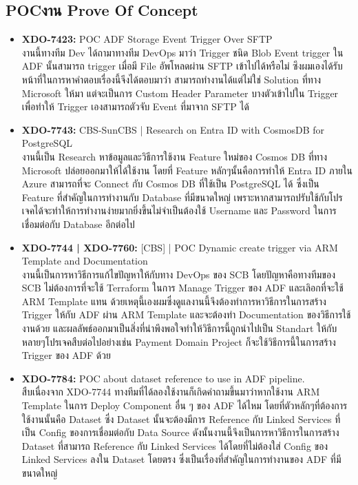\subsection{\ifenglish POC\else งาน Prove Of Concept\fi}
\begin{itemize}
      \item \textbf{XDO-7423:} POC ADF Storage Event Trigger Over SFTP\\
            งานนี้ทางทีม Dev ได้ถามาทางทีม DevOps มาว่า Trigger ชนิด Blob Event trigger ใน ADF นั้นสามารถ trigger เมื่อมี File อัพโหลดผ่าน SFTP เข้าไปได้หรือไม่ ซึงผมเองได้รับหน้าที่ในการหาคำตอบเรื่องนี้จีงได้ตอบมาว่า สามารถทำงานได้แต่ไม่ใช่ Solution ที่ทาง Microsoft ให้มา แต่จะเป็นการ Custom Header Parameter บางตัวเข้าไปใน Trigger เพื่อทำให้ Trigger เองสามารถตัวจับ Event ที่มาจาก SFTP ได้
      \item \textbf{XDO-7743:} CBS-SunCBS | Research on Entra ID with CosmosDB for PostgreSQL\\
            งานนี้เป็น Research หาข้อมูลและวิธีการใช้งาน Feature ใหม่ของ Cosmos DB ที่ทาง Microsoft ปล่อยออกมาให้ได้ใช้งาน โดยที่ Feature หลักๆนั้นคือการทำให้ Entra ID ภายใน Azure สามารถที่จะ Connect กับ Cosmos DB ที่ใช้เป็น PostgreSQL ได้ ซึ่งเป็น Feature ที่สำคัญในการทำงานกับ Database ที่มีขนาดใหญ่ เพราะหากสามารถปรับใช้กับโปรเจคได้จะทำให้การทำงานง่ายมากยิ่งขึ้นไม่จำเป็นต้องใช้ Username และ Password ในการเชื่อมต่อกับ Database อีกต่อไป
      \item \textbf{XDO-7744 | XDO-7760:} [CBS] | POC Dynamic create trigger via ARM Template and Documentation\\
            งานนี้เป็นการหาวิธีการแก้ไขปัญหาให้กับทาง DevOps ของ SCB โดยปัญหาคือทางทีมของ SCB ไม่ต้องการที่จะใช้ Terraform ในการ Manage Trigger ของ ADF และเลิอกที่จะใช้ ARM Template แทน ด้วยเหตุนี้เองผมซึ่งดูแลงานนี้จึงต้องทำการหาวิธีการในการสร้าง Trigger ให้กับ ADF ผ่าน ARM Template และจะต้องทำ Documentation ของวิธีการใช้งานด้วย และผลลัพธ์ออกมาเป็นสิ่งที่น่าพึงพอใจทำให้วิธีการนี้ถูกนำไปเป็น Standart ให้กับหลายๆโปรเจคสืบต่อไปอย่างเช่น Payment Domain Project ก็จะใช้วิธีการนี้ในการสร้าง Trigger ของ ADF ด้วย
      \item \textbf{XDO-7784:} POC about dataset reference to use in ADF pipeline.\\
            สืบเนื่องจาก XDO-7744 ทางทีมที่ได้ลองใช้งานก็เกิดคำถามขึ้นมาว่าหากใช้งาน ARM Template ในการ Deploy Component อื่น ๆ ของ ADF ได้ไหม โดยที่ตัวหลักๆที่ต้องการใช้งานนั้นคือ Dataset ซึ่ง Dataset นั้นจะต้องมีการ Reference กับ Linked Services ที่เป็น Config ของการเชื่อมต่อกับ Data Source ดังนั้นงานนี้จึงเป็นการหาวิธีการในการสร้าง Dataset ที่สามารถ Reference กับ Linked Services ได้โดยที่ไม่ต้องใส่ Config ของ Linked Services ลงใน Dataset โดยตรง ซึ่งเป็นเรื่องที่สำคัญในการทำงานของ ADF ที่มีขนาดใหญ่

\end{itemize}
